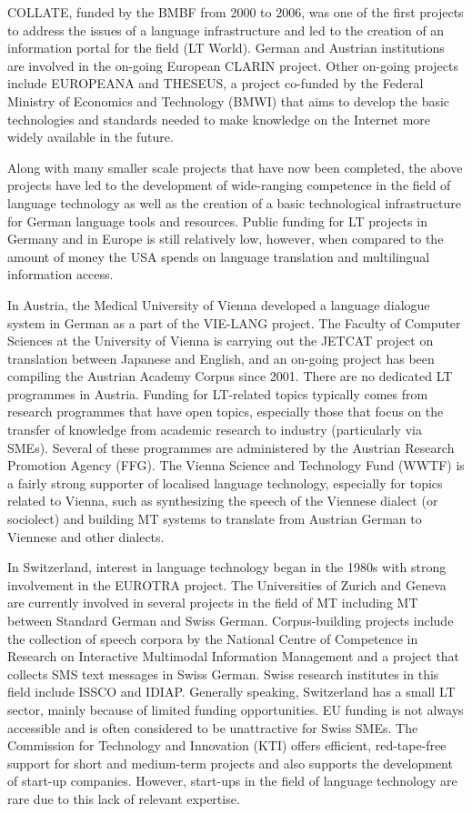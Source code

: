 \documentclass[]{../metanetpaper}
\begin{document}
\begin{Parallel}[c]{80mm}{80mm}
{    COLLATE, funded by the BMBF from 2000 to 2006, was one of the first projects to address the issues of a language infrastructure and led to the creation of an information portal for the field (LT World). German and Austrian institutions are involved in the on-going European CLARIN project. Other on-going projects include EUROPEANA and THESEUS, a project co-funded by the Federal Ministry of Economics and Technology (BMWI) that aims to develop the basic technologies and standards needed to make knowledge on the Internet more widely available in the future. 

    Along with many smaller scale projects that have now been completed, the above projects have led to the development of wide-ranging competence in the field of language technology as well as the creation of a basic technological infrastructure for German language tools and resources. Public funding for LT projects in Germany and in Europe is still relatively low, however, when compared to the amount of money the USA spends on language translation and multilingual information access\cite{laz1}. 

    In Austria, the Medical University of Vienna developed a language dialogue system in German as a part of the VIE-LANG project. The Faculty of Computer Sciences at the University of Vienna is carrying out the JETCAT project on translation between Japanese and English, and an on-going project has been compiling the Austrian Academy Corpus since 2001. There are no dedicated LT programmes in Austria. Funding for LT-related topics typically comes from research programmes that have open topics, especially those that focus on the transfer of knowledge from academic research to industry (particularly via SMEs). Several of these programmes are administered by the Austrian Research Promotion Agency (FFG). The Vienna Science and Technology Fund (WWTF) is a fairly strong supporter of localised language technology, especially for topics related to Vienna, such as synthesizing the speech of the Viennese dialect (or sociolect) and building MT systems to translate from Austrian German to Viennese and other dialects. 

    In Switzerland, interest in language technology began in the 1980s with strong involvement in the EUROTRA project. The Universities of Zurich and Geneva are currently involved in several projects in the field of MT including MT between Standard German and Swiss German\cite{latl1}. Corpus-building projects include the collection of speech corpora by the National Centre of Competence in Research on Interactive Multimodal Information Management and a project that collects SMS text messages in Swiss German\cite{sor1}. Swiss research institutes in this field include ISSCO and IDIAP. Generally speaking, Switzerland has a small LT sector, mainly because of limited funding opportunities. EU funding is not always accessible and is often considered to be unattractive for Swiss SMEs. The Commission for Technology and Innovation (KTI) offers efficient, red-tape-free support for short and medium-term projects and also supports the development of start-up companies. However, start-ups in the field of language technology are rare due to this lack of relevant expertise.

}
\end{Parallel}
\end{document}
